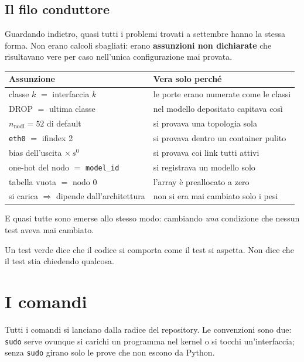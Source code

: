 \documentclass[11pt,a4paper,oneside]{report}
\begin{document}
\section{Il filo conduttore}

Guardando indietro, quasi tutti i problemi trovati a settembre hanno la stessa
forma. Non erano calcoli sbagliati: erano \textbf{assunzioni non dichiarate} che
risultavano vere per caso nell'unica configurazione mai provata.

\begin{center}
\small
\begin{tabular}{@{}ll@{}}
\toprule
\textbf{Assunzione} & \textbf{Vera solo perché} \\
\midrule
classe $k$ $=$ interfaccia $k$ & le porte erano numerate come le classi \\
DROP $=$ ultima classe & nel modello depositato capitava così \\
$n_{\text{nodi}} = 52$ di default & si provava una topologia sola \\
\texttt{eth0} $=$ ifindex 2 & si provava dentro un container pulito \\
bias dell'uscita $\times\, s^0$ & si provava coi link tutti attivi \\
one-hot del nodo $=$ \texttt{model\_id} & si registrava un modello solo \\
tabella vuota $=$ nodo 0 & l'array è preallocato a zero \\
si carica $\Rightarrow$ dipende dall'architettura & non si era mai cambiato solo i pesi \\
\bottomrule
\end{tabular}
\end{center}

E quasi tutte sono emerse allo stesso modo: cambiando \emph{una} condizione che
nessun test aveva mai cambiato.

\begin{lezione}
Un test verde dice che il codice si comporta come il test si aspetta. Non dice
che il test stia chiedendo qualcosa.
\end{lezione}

\chapter{I comandi}

Tutti i comandi si lanciano dalla radice del repository. Le convenzioni sono
due: \texttt{sudo} serve ovunque si carichi un programma nel kernel o si tocchi
un'interfaccia; senza \texttt{sudo} girano solo le prove che non escono da
Python.
\end{document}
